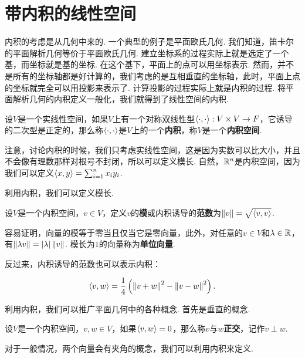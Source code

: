 \section{带内积的线性空间}\label{sec:inner-product}

内积的考虑是从几何中来的. 一个典型的例子是平面欧氏几何. 我们知道，笛卡尔的平面解析几何等价于平面欧氏几何. 建立坐标系的过程实际上就是选定了一个基，而坐标就是基的坐标. 在这个基下，平面上的点可以用坐标表示. 然而，并不是所有的坐标轴都是好计算的，我们考虑的是互相垂直的坐标轴，此时，平面上点的坐标就完全可以用投影来表示了. 计算投影的过程实际上就是内积的过程. 将平面解析几何的内积定义一般化，我们就得到了线性空间的内积. 


\begin{definition}[内积]
设$V$是一个实线性空间，如果$V$上有一个对称双线性型$\left\langle{\cdot},{\cdot}\right\rangle:V\times V\to F$，它诱导的二次型是正定的，那么称$\left\langle{\cdot},{\cdot}\right\rangle$是$V$上的一个\textbf{内积}，称$V$是一个\textbf{内积空间}. 
\end{definition}

注意，讨论内积的时候，我们只考虑实线性空间，这是因为实数可以比大小，并且不会像有理数那样对根号不封闭，所以可以定义模长. 自然，$\mathbb{R}^n$是内积空间，因为我们可以定义$\left\langle{x},{y}\right\rangle=\sum_{i=1}^n x_iy_i$. 

利用内积，我们可以定义模长. 

\begin{definition}[模]
设$V$是一个内积空间，$v\in V$，定义$v$的\textbf{模}或内积诱导的\textbf{范数}为$\left\|v\right\|=\sqrt{\left\langle{v},{v}\right\rangle}$.
\end{definition}

容易证明，向量的模等于零当且仅当它是零向量，此外，对任意的$v\in V$和$\lambda\in\mathbb{R}$，有$\left\|\lambda v\right\|=|\lambda|\left\|v\right\|$. 模长为$1$的向量称为\textbf{单位向量}.

反过来，内积诱导的范数也可以表示内积：

\begin{equation}
    \left\langle{v},{w}\right\rangle=\frac{1}{4}\left(\left\|v+w\right\|^2-\left\|v-w\right\|^2\right).\label{eq:inner}
\end{equation}

利用内积，我们可以推广平面几何中的各种概念. 首先是垂直的概念. 

\begin{definition}[正交]
设$V$是一个内积空间，$v,w\in V$，如果$\left\langle{v},{w}\right\rangle=0$，那么称$v$与$w$\textbf{正交}，记作$v\perp w$.
\end{definition}

对于一般情况，两个向量会有夹角的概念，我们可以利用内积来定义. 

